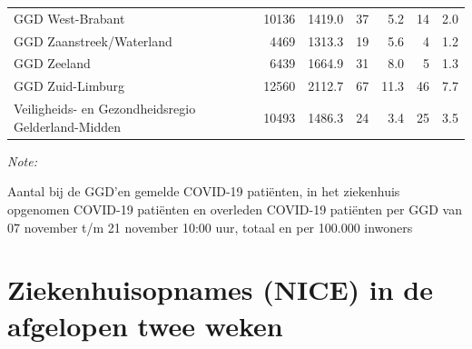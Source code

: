 \documentclass[
  english,
  man,floatsintext]{apa6}
\begin{document}
\begin{table}
\begin{threeparttable}
\begin{tabular}{lrrrrrr}
GGD West-Brabant & 10136 & 1419.0 & 37 & 5.2 & 14 & 2.0\\
GGD Zaanstreek/Waterland & 4469 & 1313.3 & 19 & 5.6 & 4 & 1.2\\
GGD Zeeland & 6439 & 1664.9 & 31 & 8.0 & 5 & 1.3\\
GGD Zuid-Limburg & 12560 & 2112.7 & 67 & 11.3 & 46 & 7.7\\
Veiligheids- en Gezondheidsregio Gelderland-Midden & 10493 & 1486.3 & 24 & 3.4 & 25 & 3.5\\
\bottomrule
\end{tabular}
\begin{tablenotes}
\item \textit{Note: } 
\item Aantal bij de GGD’en gemelde COVID-19 patiënten, in het ziekenhuis opgenomen COVID-19 patiënten en overleden COVID-19 patiënten per GGD van 07 november t/m 21 november 10:00 uur, totaal en per 100.000 inwoners
\end{tablenotes}
\end{threeparttable}
\endgroup{}
\end{table}

\newpage

\hypertarget{ziekenhuisopnames-nice-in-de-afgelopen-twee-weken}{%
\section{Ziekenhuisopnames (NICE) in de afgelopen twee weken}\label{ziekenhuisopnames-nice-in-de-afgelopen-twee-weken}}
\end{document}
